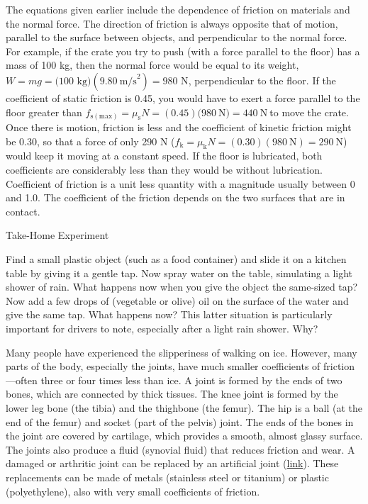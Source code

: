 \documentclass[
]{book}
\begin{document}
The equations given earlier \textbf{}include
the dependence of friction on materials and the normal force. The
direction of friction is always opposite that of motion, parallel to the
surface between objects, and perpendicular to the normal force. For
example, if the crate you try to push (with a force parallel to the
floor) has a mass of 100 kg, then the normal force would be equal to its
weight,
\({{{W = {mg}} = (}\text{100\ kg})(9\text{.}\text{80}\ \text{m/s}^{2}) = \text{980\ N}}{}\),
perpendicular to the floor. If the coefficient of static friction is
0.45, you would have to exert a force parallel to the floor greater than
\({{f_{\text{s}(\text{max})} = \mu_{\text{s}}}{N =}\left( 0.45 \right){(\text{980}}{\ \text{N}) = \text{440}}\ \text{N}}\ {}\)to
move the crate. Once there is motion, friction is less and the
coefficient of kinetic friction might be 0.30, so that a force of only
290 N
(\({{f_{\text{k}} = \mu_{\text{k}}}{N = \left( {0\text{.}\text{30}} \right)}{\left( {\text{980}\ \text{N}} \right) = \text{290}}\ \text{N}}{}\))
would keep it moving at a constant speed. If the floor is lubricated,
both coefficients are considerably less than they would be without
lubrication. Coefficient of friction is a unit less quantity with a
magnitude usually between 0 and 1.0. The coefficient of the friction
depends on the two surfaces that are in contact.

\hypertarget{fs-id1528330}{}
Take-Home Experiment

Find a small plastic object (such as a food container) and slide it on a
kitchen table by giving it a gentle tap. Now spray water on the table,
simulating a light shower of rain. What happens now when you give the
object the same-sized tap? Now add a few drops of (vegetable or olive)
oil on the surface of the water and give the same tap. What happens now?
This latter situation is particularly important for drivers to note,
especially after a light rain shower. Why?

Many people have experienced the slipperiness of walking on ice.
However, many parts of the body, especially the joints, have much
smaller coefficients of friction---often three or four times less than
ice. A joint is formed by the ends of two bones, which are connected by
thick tissues. The knee joint is formed by the lower leg bone (the
tibia) and the thighbone (the femur). The hip is a ball (at the end of
the femur) and socket (part of the pelvis) joint. The ends of the bones
in the joint are covered by cartilage, which provides a smooth, almost
glassy surface. The joints also produce a fluid (synovial fluid) that
reduces friction and wear. A damaged or arthritic joint can be replaced
by an artificial joint
(\protect\hyperlink{import-auto-id1165296217318}{link}). These
replacements can be made of metals (stainless steel or titanium) or
plastic (polyethylene), also with very small coefficients of friction.
\end{document}
